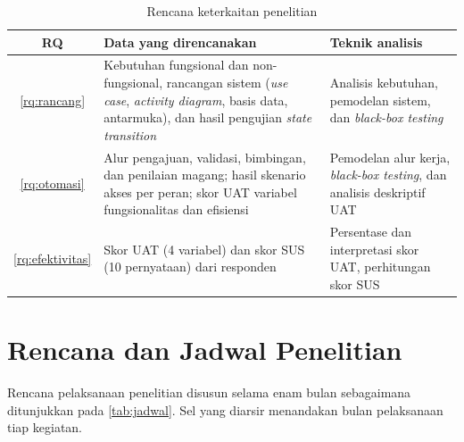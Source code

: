 \begin{table}[H]
    \centering
    \caption{Rencana keterkaitan penelitian}
    \label{tab:linkageproposal}
    \small
    \begin{tabularx}{\linewidth}{|c|X|X|}
        \hline
        \textbf{RQ} & \textbf{Data yang direncanakan} & \textbf{Teknik analisis} \\ \hline
        \cref{rq:rancang}     & Kebutuhan fungsional dan non-fungsional, rancangan sistem (\textit{use case}, \textit{activity diagram}, basis data, antarmuka), dan hasil pengujian \textit{state transition} & Analisis kebutuhan, pemodelan sistem, dan \textit{black-box testing} \\ \hline
        \cref{rq:otomasi}     & Alur pengajuan, validasi, bimbingan, dan penilaian magang; hasil skenario akses per peran; skor UAT variabel fungsionalitas dan efisiensi & Pemodelan alur kerja, \textit{black-box testing}, dan analisis deskriptif UAT \\ \hline
        \cref{rq:efektivitas} & Skor UAT (4 variabel) dan skor SUS (10 pernyataan) dari responden & Persentase dan interpretasi skor UAT, perhitungan skor SUS \\ \hline
    \end{tabularx}
\end{table}

\section{Rencana dan Jadwal Penelitian}
Rencana pelaksanaan penelitian disusun selama enam bulan sebagaimana ditunjukkan
pada \cref{tab:jadwal}. Sel yang diarsir menandakan bulan pelaksanaan tiap
kegiatan.

